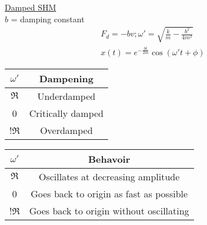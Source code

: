 \documentclass[8pt]{minimal}
\begin{document}
\underline{Damped SHM}\\
$b$ = damping constant
\begin{gather*}
    F_d = -bv; \omega' = \sqrt{\frac{k}{m}-\frac{b^2}{4m^2}}\\
    x(t) = e^{-\frac{bt}{2m}}\cos(\omega' t + \phi)
\end{gather*}
\begin{center}
    \begin{tabular}{ |c|c| }
        $\omega'$   & Dampening\\ \hline
        $\Re$   &   Underdamped\\
        0       &   Critically damped\\
        !$\Re$  &   Overdamped
    \end{tabular}
\end{center}

\begin{center}
    \begin{tabular*}{\linewidth}{|c|c|}
        $\omega'$   & Behavoir\\ \hline
        $\Re$   &   Oscillates at decreasing amplitude\\
        0       &   Goes back to origin as fast as possible\\
        !$\Re$  &   Goes back to origin without oscillating
    \end{tabular*}
\end{center}
\end{document}
